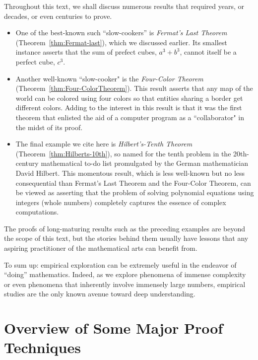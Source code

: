 \smallskip

Throughout this text, we shall discuss numerous results that required years, or decades, or even centuries to prove.
\begin{itemize}
\item
One of the best-known such ``slow-cookers'' is {\it Fermat's Last Theorem} (Theorem~\ref{thm:Fermat-last}), which we discussed earlier.  Its smallest instance asserts that the sum of prefect cubes, $a^3 + b^3$, cannot itself be a perfect cube, $c^3$.
\item
Another well-known ``slow-cooker" is the {\it Four-Color Theorem}
(Theorem~\ref{thm:Four-ColorTheorem}).  This result asserts that any map of the world can be colored using four colors so that entities sharing a border get different colors.  Adding to the interest in this result is that it was the first theorem that enlisted the aid of a computer program as a ``collaborator" in the midst of its proof.
\item
The final example we cite here is {\it Hilbert's-Tenth Theorem} (Theorem~\ref{thm:Hilberts-10th}), so named for the tenth problem in the 20th-century mathematical to-do list promulgated by the German mathematician David Hilbert.  This momentous result, which is less well-known but no less consequential than Fermat's Last Theorem and the Four-Color Theorem, can be viewed as asserting that the problem of solving polynomial equations using integers (whole numbers) completely captures the essence of complex computations.
  
\end{itemize}
The proofs of long-maturing results such as the preceding examples are beyond the scope of this text, but the stories behind them usually have lessons that any aspiring practitioner of the mathematical arts can benefit from.

\smallskip

To sum up: empirical exploration can be extremely useful in the endeavor of ``doing'' mathematics.  Indeed, as we explore phenomena of immense complexity or even phenomena that inherently involve immensely large numbers, empirical studies are the only known avenue toward deep understanding.


\section{Overview of Some Major Proof Techniques}
\label{sec:major-proof-techniques}

